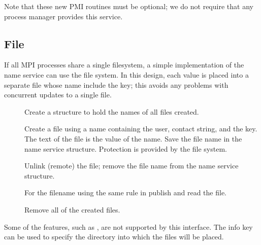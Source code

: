 \documentclass{article}
\begin{document}
Note that these new PMI routines must be optional; we do not require
that any process manager provides this service.

\subsection{File}
\label{sec:namepub-file}
If all MPI processes share a single filesystem, a simple
implementation of the name service can use the file system.  
In this design, each value is placed into a separate file whose name
include the key; this avoids
any problems with concurrent updates to a single file.
\begin{description}
\item[]Create a structure to hold the names of all files created.
\item[]Create a file using a name containing the user, contact
  string, and the key.  The text of the file is the value of the name.
  Save the file name in the name service structure.  Protection is
  provided by the file system.
\item[]Unlink (remote) the file; remove the file name from
  the name service structure.
\item[]For the filename using the same rule in publish and read
  the file.
\item[]Remove all of the created files.
\end{description}

Some of the features, such as , are not supported
by this interface.  The info key  can be used to
specify the directory into which the files will be placed.
\end{document}
